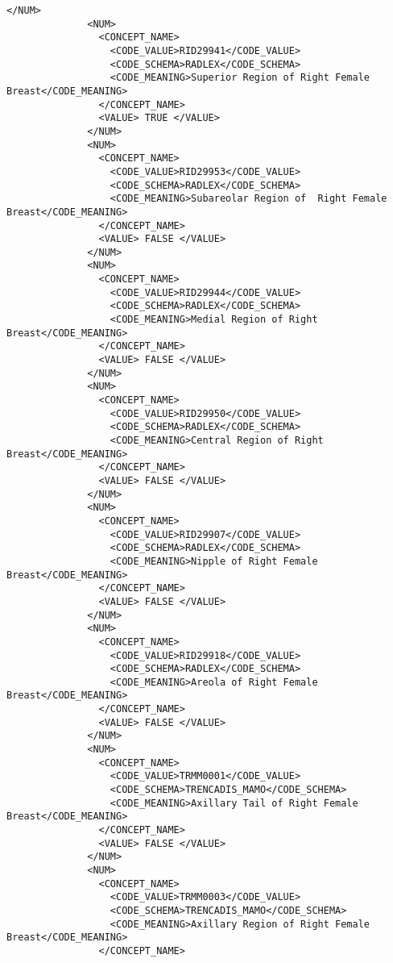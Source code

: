 \begin{lstlisting}[label=dicom-report,caption=Informe estructurado de una exploración de mama]
              </NUM>
              <NUM>
                <CONCEPT_NAME>
                  <CODE_VALUE>RID29941</CODE_VALUE>
                  <CODE_SCHEMA>RADLEX</CODE_SCHEMA>
                  <CODE_MEANING>Superior Region of Right Female Breast</CODE_MEANING>
                </CONCEPT_NAME>
                <VALUE> TRUE </VALUE>
              </NUM>
              <NUM>
                <CONCEPT_NAME>
                  <CODE_VALUE>RID29953</CODE_VALUE>
                  <CODE_SCHEMA>RADLEX</CODE_SCHEMA>
                  <CODE_MEANING>Subareolar Region of  Right Female Breast</CODE_MEANING>
                </CONCEPT_NAME>
                <VALUE> FALSE </VALUE>
              </NUM>
              <NUM>
                <CONCEPT_NAME>
                  <CODE_VALUE>RID29944</CODE_VALUE>
                  <CODE_SCHEMA>RADLEX</CODE_SCHEMA>
                  <CODE_MEANING>Medial Region of Right Breast</CODE_MEANING>
                </CONCEPT_NAME>
                <VALUE> FALSE </VALUE>
              </NUM>
              <NUM>	
                <CONCEPT_NAME>
                  <CODE_VALUE>RID29950</CODE_VALUE>
                  <CODE_SCHEMA>RADLEX</CODE_SCHEMA>
                  <CODE_MEANING>Central Region of Right Breast</CODE_MEANING>
                </CONCEPT_NAME>
                <VALUE> FALSE </VALUE>
              </NUM>
              <NUM>
                <CONCEPT_NAME>
                  <CODE_VALUE>RID29907</CODE_VALUE>
                  <CODE_SCHEMA>RADLEX</CODE_SCHEMA>
                  <CODE_MEANING>Nipple of Right Female Breast</CODE_MEANING>
                </CONCEPT_NAME>
                <VALUE> FALSE </VALUE>
              </NUM>
              <NUM>
                <CONCEPT_NAME>
                  <CODE_VALUE>RID29918</CODE_VALUE>
                  <CODE_SCHEMA>RADLEX</CODE_SCHEMA>
                  <CODE_MEANING>Areola of Right Female Breast</CODE_MEANING>
                </CONCEPT_NAME>
                <VALUE> FALSE </VALUE>
              </NUM>
              <NUM>
                <CONCEPT_NAME>
                  <CODE_VALUE>TRMM0001</CODE_VALUE>
                  <CODE_SCHEMA>TRENCADIS_MAMO</CODE_SCHEMA>
                  <CODE_MEANING>Axillary Tail of Right Female Breast</CODE_MEANING>
                </CONCEPT_NAME>
                <VALUE> FALSE </VALUE>
              </NUM>
              <NUM>
                <CONCEPT_NAME>
                  <CODE_VALUE>TRMM0003</CODE_VALUE>
                  <CODE_SCHEMA>TRENCADIS_MAMO</CODE_SCHEMA>
                  <CODE_MEANING>Axillary Region of Right Female Breast</CODE_MEANING>
                </CONCEPT_NAME>

\end{lstlisting}
